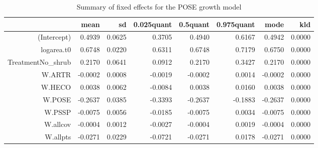 \begin{table}[ht]
\centering
\caption{Summary of fixed effects for the POSE growth model} 
\label{POSEgrowth}
\begin{tabular}{rrrrrrrr}
  \hline
 & mean & sd & 0.025quant & 0.5quant & 0.975quant & mode & kld \\ 
  \hline
(Intercept) & 0.4939 & 0.0625 & 0.3705 & 0.4940 & 0.6167 & 0.4942 & 0.0000 \\ 
  logarea.t0 & 0.6748 & 0.0220 & 0.6311 & 0.6748 & 0.7179 & 0.6750 & 0.0000 \\ 
  TreatmentNo\_shrub & 0.2170 & 0.0641 & 0.0912 & 0.2170 & 0.3427 & 0.2170 & 0.0000 \\ 
  W.ARTR & -0.0002 & 0.0008 & -0.0019 & -0.0002 & 0.0014 & -0.0002 & 0.0000 \\ 
  W.HECO & 0.0038 & 0.0062 & -0.0084 & 0.0038 & 0.0160 & 0.0038 & 0.0000 \\ 
  W.POSE & -0.2637 & 0.0385 & -0.3393 & -0.2637 & -0.1883 & -0.2637 & 0.0000 \\ 
  W.PSSP & -0.0075 & 0.0056 & -0.0185 & -0.0075 & 0.0034 & -0.0075 & 0.0000 \\ 
  W.allcov & -0.0004 & 0.0012 & -0.0027 & -0.0004 & 0.0019 & -0.0004 & 0.0000 \\ 
  W.allpts & -0.0271 & 0.0229 & -0.0721 & -0.0271 & 0.0178 & -0.0271 & 0.0000 \\ 
   \hline
\end{tabular}
\end{table}

